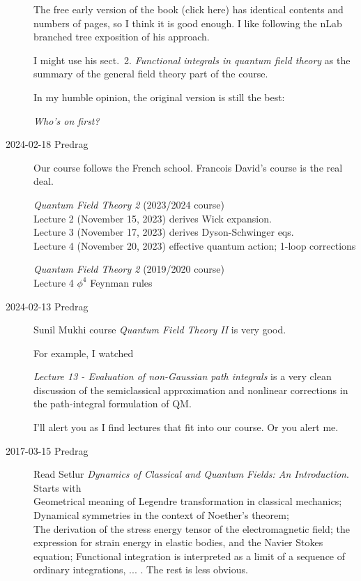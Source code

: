 \begin{description}
The free early version of the book (click
{here}) has identical contents and numbers of pages, so I think it is
good enough.
I like following the
{nLab} branched tree exposition of his approach.

I might use his
sect.~2. \emph{Functional integrals in quantum field theory} as
the summary of the general field theory part of the course.

In my humble opinion, the original version is still the best:

 {\em Who's on first?}

\item[2024-02-18 Predrag]
Our course follows the French school.
Francois David's course is the real deal.

 {\em Quantum Field Theory  2}
(2023/2024 course)
\\
Lecture 2 (November 15, 2023) derives Wick expansion.
\\
Lecture 3 (November 17, 2023) derives Dyson-Schwinger eqs.
\\
Lecture 4 (November 20, 2023) effective quantum action; 1-loop corrections

 {\em Quantum Field Theory  2}
(2019/2020 course)
\\
Lecture 4 $\phi^4$ Feynman rules

\item[2024-02-13 Predrag]  Sunil Mukhi course
{\em Quantum Field Theory II} is very good.

For example,  I watched

{\em Lecture 13 - Evaluation of non-Gaussian path integrals}
is a very clean discussion of the semiclassical approximation and nonlinear
corrections in the path-integral formulation of QM.

I'll alert you as I find lectures that fit into our course. Or you alert me.

\item[2017-03-15 Predrag] Read
Setlur
{\em Dynamics of Classical and Quantum Fields: An Introduction}.
Starts with
\\
Geometrical meaning of Legendre transformation in classical mechanics;
\\
Dynamical symmetries in the context of Noether's theorem;
\\
The derivation of the stress energy tensor of the electromagnetic field;
the expression for strain energy in elastic bodies, and the Navier Stokes
equation;
Functional integration is interpreted as a limit of a sequence of
ordinary integrations, ... .
The rest is less obvious.


\end{description}
